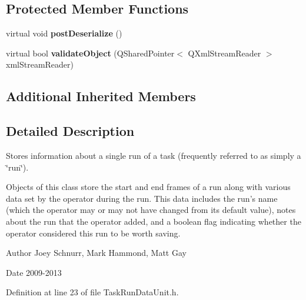 \subsection*{Protected Member Functions}
\begin{DoxyCompactItemize}
\item 
\hypertarget{class_picto_1_1_task_run_data_unit_aea5247ecf1b32c4674dcbd67e950dafb}{virtual void {\bfseries post\-Deserialize} ()}\label{class_picto_1_1_task_run_data_unit_aea5247ecf1b32c4674dcbd67e950dafb}

\item 
\hypertarget{class_picto_1_1_task_run_data_unit_a2986c10981898333f4deac96eda84a4e}{virtual bool {\bfseries validate\-Object} (Q\-Shared\-Pointer$<$ Q\-Xml\-Stream\-Reader $>$ xml\-Stream\-Reader)}\label{class_picto_1_1_task_run_data_unit_a2986c10981898333f4deac96eda84a4e}

\end{DoxyCompactItemize}
\subsection*{Additional Inherited Members}


\subsection{Detailed Description}
Stores information about a single run of a task (frequently referred to as simply a \char`\"{}run\char`\"{}). 

Objects of this class store the start and end frames of a run along with various data set by the operator during the run. This data includes the run's name (which the operator may or may not have changed from its default value), notes about the run that the operator added, and a boolean flag indicating whether the operator considered this run to be worth saving. \begin{DoxyAuthor}{Author}
Joey Schnurr, Mark Hammond, Matt Gay 
\end{DoxyAuthor}
\begin{DoxyDate}{Date}
2009-\/2013 
\end{DoxyDate}


Definition at line 23 of file Task\-Run\-Data\-Unit.\-h.



